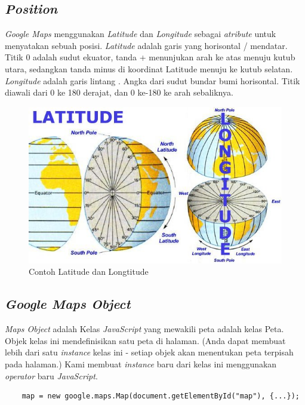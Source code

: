  \subsection{\textit{Position}}
 \textit{Google Maps} menggunakan \textit{Latitude} dan \textit{Longitude}  sebagai  \textit{atribute} untuk menyatakan sebuah posisi.\cite{GoogleMaps:02:coordinates}
 \textit{Latitude} adalah garis yang horisontal / mendatar. Titik 0 adalah sudut ekuator, tanda + menunjukan arah ke atas menuju kutub utara, sedangkan tanda minus di koordinat Latitude menuju ke kutub selatan. \textit{Longitude} adalah garis lintang . Angka dari sudut bundar bumi horisontal. Titik diawali dari 0 ke 180 derajat, dan 0 ke-180 ke arah sebaliknya.
 \begin{figure}[H]
    \centering
    \includegraphics[scale=0.5]{Gambar/definition-of-latitude-longitude.jpg}
    \caption{Contoh Latitude dan Longtitude }
    \label{fig:my_label}
\end{figure}
 
 
 
 \subsection{\textit{Google Maps Object}}
 \textit{Maps Object} adalah Kelas \textit{JavaScript} yang mewakili peta adalah kelas Peta. Objek kelas ini mendefinisikan satu peta di halaman\cite{GoogleMaps:01:MapsObject}. (Anda dapat membuat lebih dari satu \textit{instance} kelas ini - setiap objek akan menentukan peta terpisah pada halaman.) Kami membuat \textit{instance} baru dari kelas ini menggunakan \textit{operator} baru \textit{JavaScript}.
  \begin{lstlisting}
    map = new google.maps.Map(document.getElementById("map"), {...});
 \end{lstlisting}
